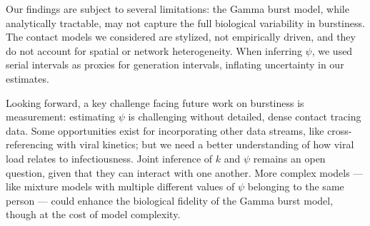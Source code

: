Our findings are subject to several limitations: the Gamma burst model, while analytically tractable, may not capture the full biological variability in burstiness. The contact models we considered are stylized, not empirically driven, and they do not account for spatial or network heterogeneity. When inferring $\psi$, we used serial intervals as proxies for generation intervals, inflating uncertainty in our estimates. 

Looking forward, a key challenge facing future work on burstiness is measurement: estimating $\psi$ is challenging without detailed, dense contact tracing data. Some opportunities exist for incorporating other data streams, like cross-referencing with viral kinetics; but we need a better understanding of how viral load relates to infectiousness.\cite{goyal_viral_2021} Joint inference of $k$ and $\psi$ remains an open question, given that they can interact with one another. More complex models --- like mixture models with multiple different values of $\psi$ belonging to the same person --- could enhance the biological fidelity of the Gamma burst model, though at the cost of model complexity. 


\vspace{2cm} 










